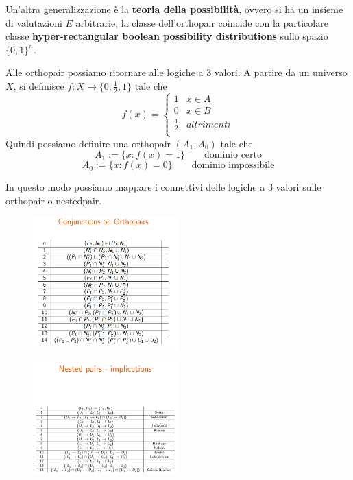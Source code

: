 Un'altra generalizzazione è la \textbf{teoria della possibilità}, ovvero si ha un insieme 
di valutazioni $E$ arbitrarie, la classe dell'orthopair coincide  con la particolare 
classe \textbf{hyper-rectangular boolean possibility distributions} sullo spazio 
$\{0,1\}^n $.

Alle orthopair possiamo ritornare alle logiche a 3 valori. A partire da un universo 
$X$, si definisce $f: X \to \{0,\frac{1}{2},1\}$ tale che 
$$f(x) = \begin{cases}
    1&x\in A\\
    0&x\in B\\
    \frac{1}{2}&altrimenti\\
\end{cases}$$
Quindi possiamo definire una orthopair $(A_1,A_0)$ tale che 
$$A_1:=\{x:f(x)=1\} \qquad \text{dominio certo}$$
$$A_0:=\{x:f(x)=0\}\qquad \text{dominio impossibile}$$

In questo modo possiamo mappare i connettivi delle logiche a $3$ valori sulle orthopair 
o nestedpair.

\begin{figure}[!h]
    \centering
    \includegraphics[width=0.5\textwidth]{img/sistemi_incerti/conj_ortho.png}
\end{figure}

\begin{figure}[!h]
    \centering
    \includegraphics[width=0.5\textwidth]{img/sistemi_incerti/impl_nested_pair.png}
\end{figure}

